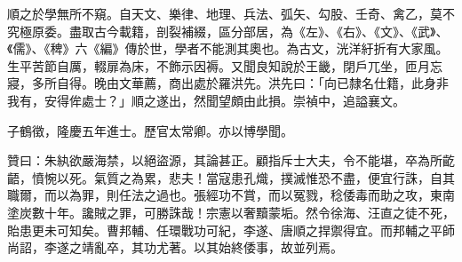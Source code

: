 \begin{pinyinscope}
順之於學無所不窺。自天文、樂律、地理、兵法、弧矢、勾股、壬奇、禽乙，莫不究極原委。盡取古今載籍，剖裂補綴，區分部居，為《左》、《右》、《文》、《武》、《儒》、《稗》六《編》傳於世，學者不能測其奧也。為古文，洸洋紆折有大家風。生平苦節自厲，輟扉為床，不飾示因褥。又聞良知說於王畿，閉戶兀坐，匝月忘寢，多所自得。晚由文華薦，商出處於羅洪先。洪先曰：「向已隸名仕籍，此身非我有，安得侔處士？」順之遂出，然聞望頗由此損。崇禎中，追謚襄文。

子鶴徵，隆慶五年進士。歷官太常卿。亦以博學聞。

贊曰：朱紈欲嚴海禁，以絕盜源，其論甚正。顧指斥士大夫，令不能堪，卒為所齕齬，憤惋以死。氣質之為累，悲夫！當寇患孔熾，撲滅惟恐不盡，便宜行誅，自其職爾，而以為罪，則任法之過也。張經功不賞，而以冤戮，稔倭毒而助之攻，東南塗炭數十年。讒賊之罪，可勝誅哉！宗憲以奢黷蒙垢。然令徐海、汪直之徒不死，貽患更未可知矣。曹邦輔、任環戰功可紀，李遂、唐順之捍禦得宜。而邦輔之平師尚詔，李遂之靖亂卒，其功尤著。以其始終倭事，故並列焉。


\end{pinyinscope}